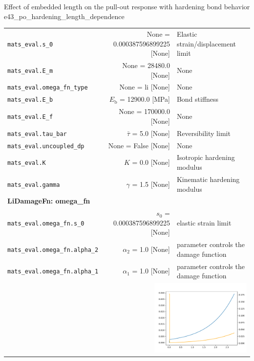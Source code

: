 \documentclass[main.tex]{subfiles}
\begin{document}
\begin{bmcsex}{Effect of embedded length on the pull-out response with hardening bond behavior
    }{e43_po_hardening_length_dependence}
\begin{center}
{\begin{longtable}{lrp{4cm}}
\texttt{mats\_eval.s\_0} & None = 0.000387596899225 [None] & {\footnotesize Elastic strain/displacement limit}  \\
            \texttt{mats\_eval.E\_m} & None = 28480.0 [None] & {\footnotesize None}  \\
            \texttt{mats\_eval.omega\_fn\_type} & None = li [None] & {\footnotesize None}  \\
            \texttt{mats\_eval.E\_b} & $E_\mathrm{b}$ = 12900.0 [MPa] & {\footnotesize Bond stiffness}  \\
            \texttt{mats\_eval.E\_f} & None = 170000.0 [None] & {\footnotesize None}  \\
            \texttt{mats\_eval.tau\_bar} & $\bar{\tau}$ = 5.0 [None] & {\footnotesize Reversibility limit}  \\
            \texttt{mats\_eval.uncoupled\_dp} & None = False [None] & {\footnotesize None}  \\
            \texttt{mats\_eval.K} & $K$ = 0.0 [None] & {\footnotesize Isotropic hardening modulus}  \\
            \texttt{mats\_eval.gamma} & $\gamma$ = 1.5 [None] & {\footnotesize Kinematic hardening modulus}  \\
            \midrule
\multicolumn{3}{l}{\textbf{\textsf{LiDamageFn: omega\_fn}}}\\

\texttt{mats\_eval.omega\_fn.s\_0} & $s_0$ = 0.000387596899225 [None] & {\footnotesize elastic strain limit}  \\
            \texttt{mats\_eval.omega\_fn.alpha\_2} & $\alpha_2$ = 1.0 [None] & {\footnotesize parameter controls the damage function}  \\
            \texttt{mats\_eval.omega\_fn.alpha\_1} & $\alpha_1$ = 1.0 [None] & {\footnotesize parameter controls the damage function}  \\
            
\multicolumn{3}{r}{\includegraphics[width=5cm]{examples/e43_po_hardening_length_dependence/fig_Li_damage_function.pdf}}\\
\bottomrule 
\end{longtable}
}


\end{center}
\end{bmcsex}
\end{document}
